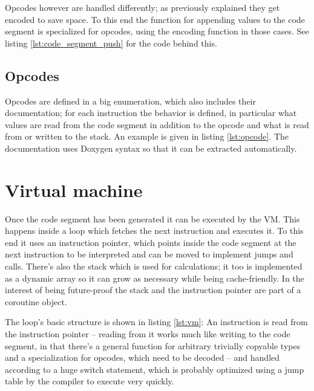 		Opcodes however are handled differently; as previously explained they get encoded to save space. To this end the function for appending values to the code segment is specialized for opcodes, using the encoding function in those cases. See listing \ref{lst:code_segment_push} for the code behind this.
		
		
		\subsection{Opcodes}
			
			Opcodes are defined in a big enumeration, which also includes their documentation; for each instruction the behavior is defined, in particular what values are read from the code segment in addition to the opcode and what is read from or written to the stack. An example is given in listing \ref{lst:opcode}. The documentation uses Doxygen syntax so that it can be extracted automatically.
			
	
	\section{Virtual machine}
		
		Once the code segment has been generated it can be executed by the VM. This happens inside a loop which fetches the next instruction and executes it. To this end it uses an instruction pointer, which points inside the code segment at the next instruction to be interpreted and can be moved to implement jumps and calls. There's also the stack which is used for calculations; it too is implemented as a dynamic array so it can grow as necessary while being cache-friendly. In the interest of being future-proof the stack and the instruction pointer are part of a coroutine object. 
		
		The loop's basic structure is shown in listing \ref{lst:vm}: An instruction is read from the instruction pointer -- reading from it works much like writing to the code segment, in that there's a general function for arbitrary trivially copyable types and a specialization for opcodes, which need to be decoded -- and handled according to a huge switch statement, which is probably optimized using a jump table by the compiler to execute very quickly.
		
